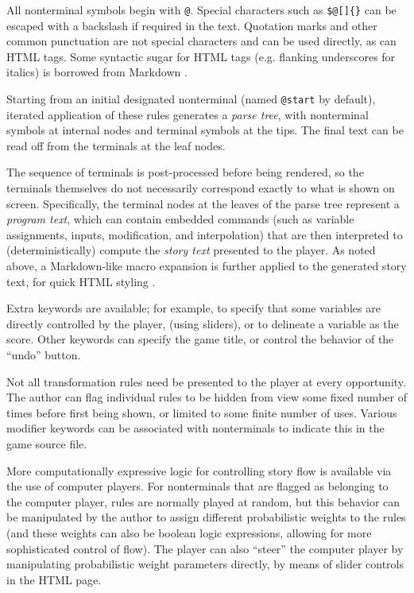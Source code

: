 \documentclass{acm_proc_article-sp}
\begin{document}
All nonterminal symbols begin with {\tt @}.
Special characters such as {\tt \$@[]\{\}} can be escaped with a backslash if required in the text.
Quotation marks and other common punctuation are not special characters and can be used directly, as can HTML tags.
Some syntactic sugar for HTML tags (e.g. flanking underscores for italics) is borrowed from Markdown \cite{Markdown}.

Starting from an initial designated nonterminal (named {\tt @start} by default),
iterated application of these rules generates a {\em parse tree},
with nonterminal symbols at internal nodes and terminal symbols at the tips.
The final text can be read off from the terminals at the leaf nodes.

The sequence of terminals is post-processed before being rendered,
so the terminals themselves do not necessarily correspond exactly to what is shown on screen.
Specifically, the terminal nodes at the leaves of the parse tree represent a {\em program text},
which can contain embedded commands (such as variable assignments, inputs, modification, and interpolation)
that are then interpreted to (deterministically) compute the {\em story text} presented to the player.
As noted above, a Markdown-like macro expansion is further applied to the generated story text,
for quick HTML styling \cite{Markdown}.

Extra keywords are available; for example, to specify that some variables are directly controlled by the player,
(using sliders), or to delineate a variable as the score.
Other keywords can specify the game title, or control the behavior of the ``undo'' button.

Not all transformation rules need be presented to the player at every opportunity.
The author can flag individual rules to be hidden from view some fixed number of times
before first being shown, or limited to some finite number of uses.
Various modifier keywords can be associated with nonterminals to indicate this in the game source file.

More computationally expressive logic for controlling story flow is available via the use of computer players.
For nonterminals that are flagged as belonging to the computer player,
rules are normally played at random,
but this behavior can be manipulated by the author to
assign different probabilistic weights to the rules
(and these weights can also be boolean logic expressions, allowing for more sophisticated control of flow).
The player can also ``steer'' the computer player by manipulating probabilistic weight parameters directly,
by means of slider controls in the HTML page.
\end{document}

